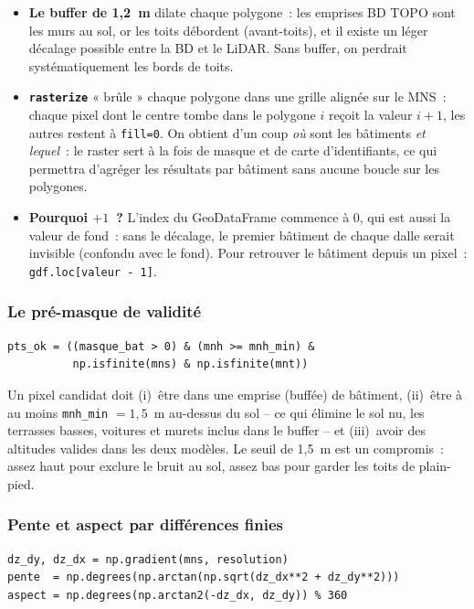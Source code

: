 \documentclass[11pt,a4paper]{article}
\newcommand{\fonction}[1]{\texttt{#1}}
\begin{document}
\begin{itemize}
  \item \textbf{Le buffer de 1,2~m} dilate chaque polygone~: les emprises
    BD TOPO sont les murs au sol, or les toits débordent (avant-toits), et il
    existe un léger décalage possible entre la BD et le LiDAR. Sans buffer, on
    perdrait systématiquement les bords de toits.
  \item \textbf{\fonction{rasterize}} « brûle » chaque polygone dans une grille
    alignée sur le MNS~: chaque pixel dont le centre tombe dans le polygone
    $i$ reçoit la valeur $i+1$, les autres restent à \fonction{fill=0}. On
    obtient d'un coup \emph{où} sont les bâtiments \emph{et lequel}~: le raster
    sert à la fois de masque et de carte d'identifiants, ce qui permettra
    d'agréger les résultats par bâtiment sans aucune boucle sur les polygones.
  \item \textbf{Pourquoi $+1$~?} L'index du GeoDataFrame commence à 0, qui est
    aussi la valeur de fond~: sans le décalage, le premier bâtiment de chaque
    dalle serait invisible (confondu avec le fond). Pour retrouver le bâtiment
    depuis un pixel~: \fonction{gdf.loc[valeur - 1]}.
\end{itemize}

\subsubsection{Le pré-masque de validité}

\begin{lstlisting}
pts_ok = ((masque_bat > 0) & (mnh >= mnh_min) &
          np.isfinite(mns) & np.isfinite(mnt))
\end{lstlisting}

Un pixel candidat doit (i)~être dans une emprise (buffée) de bâtiment, (ii)~être
à au moins \fonction{mnh\_min} $= 1{,}5$~m au-dessus du sol -- ce qui élimine le
sol nu, les terrasses basses, voitures et murets inclus dans le buffer -- et
(iii)~avoir des altitudes valides dans les deux modèles. Le seuil de 1,5~m est
un compromis~: assez haut pour exclure le bruit au sol, assez bas pour garder
les toits de plain-pied.

\subsubsection{Pente et aspect par différences finies}

\begin{lstlisting}
dz_dy, dz_dx = np.gradient(mns, resolution)
pente  = np.degrees(np.arctan(np.sqrt(dz_dx**2 + dz_dy**2)))
aspect = np.degrees(np.arctan2(-dz_dx, dz_dy)) % 360
\end{lstlisting}
\end{document}

